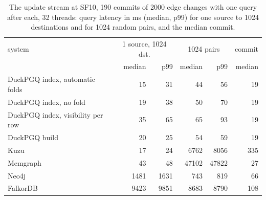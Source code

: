 \begin{table}[t]\centering\scriptsize\setlength{\tabcolsep}{3pt}
\caption{The update stream at SF10, 190 commits of 2000 edge changes with one query after each, 32 threads: query latency in ms (median, p99) for one source to 1024 destinations and for 1024 random pairs, and the median commit.}\label{tab:updates}
\begin{tabular}{lrrrrr}\toprule
system & \multicolumn{2}{c}{1 source, 1024 dst.} & \multicolumn{2}{c}{1024 pairs} & commit \\
 & median & p99 & median & p99 & median \\ \midrule
DuckPGQ index, automatic folds & 15 & 31 & 44 & 56 & 19 \\
DuckPGQ index, no fold & 19 & 38 & 50 & 70 & 19 \\
DuckPGQ index, visibility per row & 35 & 65 & 65 & 93 & 19 \\
DuckPGQ build & 20 & 25 & 54 & 59 & 19 \\
\addlinespace
Kuzu & 17 & 24 & 6762 & 8056 & 335 \\
Memgraph & 43 & 48 & 47102 & 47822 & 27 \\
Neo4j & 1481 & 1631 & 743 & 819 & 66 \\
FalkorDB & 9423 & 9851 & 8683 & 8790 & 108 \\
\bottomrule\end{tabular}\end{table}
